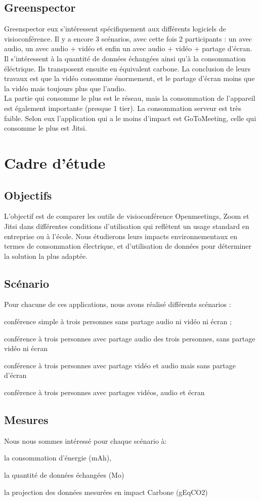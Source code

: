 \documentclass[11pt,a4paper]{article}
\begin{document}
\subsection{Greenspector}
Greenspector eux s'intéressent spécifiquement aux différents logiciels de visioconférence. Il y a encore 3 scénarios, avec cette fois 2 participants : un avec audio, un avec audio + vidéo et enfin un avec audio + vidéo + partage d'écran.\\
Il s'intéressent à la quantité de données échangées ainsi qu'à la consommation éléctrique. Ils transposent ensuite en équivalent carbone. La conclusion de leurs travaux est que la vidéo consomme énormement, et le partage d'écran moins que la vidéo mais toujours plus que l'audio.\\
La partie qui consomme le plus est le réseau, mais la consommation de l'appareil est également importante (presque 1 tier). La consommation serveur est très faible. Selon eux l'application qui a le moins d'impact est GoToMeeting, celle qui consomme le plus est Jitsi.
\section{Cadre d'étude}
\subsection{Objectifs}
L'objectif est de comparer les outils de visioconférence Openmeetings, Zoom et Jitsi dans différentes conditions d'utilisation qui reflètent un usage standard en entreprise ou à l'école. Nous étudierons leurs impacts environnementaux en termes de consommation électrique, et d'utilisation de données pour déterminer la solution la plus adaptée.
\subsection{Scénario}
Pour chacune de ces applications, nous avons réalisé différents scénarios :
\bi \item conférence simple à trois personnes sans partage audio ni vidéo ni écran ;
\item conférence à trois personnes avec partage audio des trois personnes, sans partage vidéo ni écran
\item conférence à trois personnes avec partage vidéo et audio mais sans partage d'écran
\item conférence à trois personnes avec partages vidéos, audio et écran \ei 
\subsection{Mesures}
Nous nous sommes intéressé pour chaque scénario à:
\bi \item la consommation d’énergie (mAh),
\item la quantité de données échangées (Mo)
\item la projection des données mesurées en impact Carbone (gEqCO2)
\ei
\end{document}
